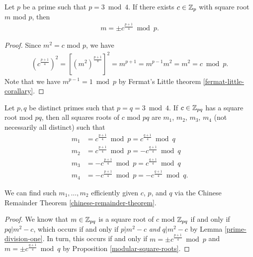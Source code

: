 \begin{prop}\label{modular-square-roots}
    Let $p$ be a prime such that $p = 3 \bmod 4$. If there exists $c \in \mathbb{Z}_p$ with square root $m$ mod $p$, then
    \begin{align*}
        m = \pm c^{\frac{p+1}{4}} \bmod p.
    \end{align*}
\end{prop}

\begin{proof} Since $m^2 = c$ mod $p$, we have
    \begin{align*}
        \left(c^{\frac{p+1}{4}}\right)^2 = \left[\left(m^2\right)^{\frac{p+1}{4}}\right]^{2} = m^{p+1} = m^{p-1}m^2 = m^2 = c \bmod p.
    \end{align*}
    Note that we have $m^{p-1} = 1 \bmod p$ by Fermat's Little theorem \ref{fermat-little-corallary}.
\end{proof}

\begin{prop}
    Let $p, q$ be distinct primes such that $p = q = 3 \bmod 4$. If $c \in \mathbb{Z}_{pq}$ has a square root mod $pq$, then all squares roots of $c$ mod $pq$ are $m_1$, $m_2$, $m_3$, $m_4$ (not necessarily all distinct) such that
    \begin{align*}
        m_1 &= c^{\frac{p+1}{4}} \bmod p = c^{\frac{q+1}{4}} \bmod q \\
        m_2 &= c^{\frac{p+1}{4}} \bmod p = -c^{\frac{q+1}{4}} \bmod q \\
        m_3 &= -c^{\frac{p+1}{4}} \bmod p = c^{\frac{q+1}{4}} \bmod q \\
        m_4 &= -c^{\frac{p+1}{4}} \bmod p = -c^{\frac{q+1}{4}} \bmod q.
    \end{align*}
\end{prop}

\begin{rmk}
    We can find such $m_1, \ldots, m_2$ efficiently given $c$, $p$, and $q$ via the Chinese Remainder Theorem \ref{chinese-remainder-theorem}.
\end{rmk}

\begin{proof}
    We know that $m \in \mathbb{Z}_{pq}$ is a square root of $c$ mod $\mathbb{Z}_{pq}$ if and only if $pq | m^2 - c$, which occurs if and only if $p | m^2 - c$ \emph{and} $q | m^2 - c$ by Lemma \ref{prime-division-one}. In turn, this occurs if and only if $m = \pm c^{\frac{p+1}{4}} \bmod p$ and $m = \pm c^{\frac{q+1}{4}} \bmod q$ by Proposition \ref{modular-square-roots}.
\end{proof}

